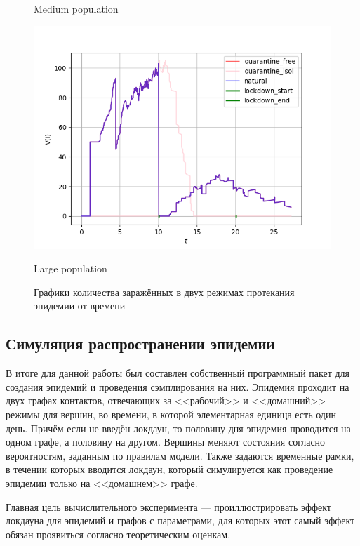 \begin{figure}[h]
\begin{minipage}{0.49\linewidth}
			\centering
			Medium population
		\end{minipage}
		\begin{center}
			\begin{minipage}{0.5\linewidth}
			\includegraphics[width=\linewidth, keepaspectratio]{../figs/basic_experiment_big_population}
			
			\centering
			Large population
		\end{minipage}
		\end{center}
		\caption{Графики количества заражённых в двух режимах протекания эпидемии от времени}\label{pic:basic}
	\end{figure}

	\subsection*{Симуляция распространении эпидемии}
	
	В итоге для данной работы был составлен собственный программный пакет для создания эпидемий и проведения сэмплирования на них. Эпидемия проходит на двух графах контактов, отвечающих за <<рабочий>> и <<домашний>> режимы для вершин, во времени, в которой элементарная единица есть один день. Причём если не введён локдаун, то половину дня эпидемия проводится на одном графе, а половину на другом. Вершины меняют состояния согласно вероятностям, заданным по правилам модели. Также задаются временные рамки, в течении которых вводится локдаун, который симулируется как проведение эпидемии только на <<домашнем>> графе.
	
	Главная цель вычислительного эксперимента --- проиллюстрировать эффект локдауна для эпидемий и графов с параметрами, для которых этот самый эффект обязан проявиться согласно теоретическим оценкам. 
	
